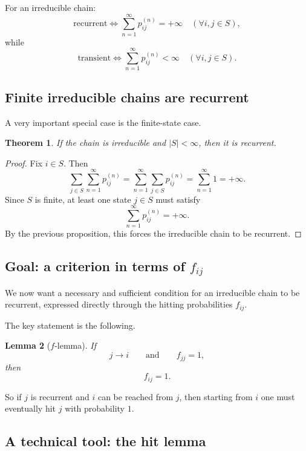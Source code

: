 \documentclass[11pt]{article}
\newtheorem{theorem}{Theorem}[section]
\newtheorem{lemma}[theorem]{Lemma}
\theoremstyle{definition}
\begin{document}
\begin{keyformula}
For an irreducible chain:
\[
\text{recurrent}
\iff
\sum_{n=1}^\infty p_{ij}^{(n)}=+\infty \quad (\forall i,j\in S),
\]
while
\[
\text{transient}
\iff
\sum_{n=1}^\infty p_{ij}^{(n)}<\infty \quad (\forall i,j\in S).
\]
\end{keyformula}

\subsection{Finite irreducible chains are recurrent}

A very important special case is the finite-state case.

\begin{theorem}
If the chain is irreducible and \(|S|<\infty\), then it is recurrent.
\end{theorem}

\begin{proof}
Fix \(i\in S\). Then
\[
\sum_{j\in S}\sum_{n=1}^\infty p_{ij}^{(n)}
=
\sum_{n=1}^\infty \sum_{j\in S} p_{ij}^{(n)}
=
\sum_{n=1}^\infty 1
=
+\infty.
\]
Since \(S\) is finite, at least one state \(j\in S\) must satisfy
\[
\sum_{n=1}^\infty p_{ij}^{(n)}=+\infty.
\]
By the previous proposition, this forces the irreducible chain to be recurrent.
\end{proof}

\subsection{Goal: a criterion in terms of \texorpdfstring{$f_{ij}$}{fij}}

We now want a necessary and sufficient condition for an irreducible chain to be recurrent, expressed directly through the hitting probabilities \(f_{ij}\).

The key statement is the following.

\begin{lemma}[\(f\)-lemma]
If
\[
j\to i
\qquad\text{and}\qquad
f_{jj}=1,
\]
then
\[
f_{ij}=1.
\]
\end{lemma}

So if \(j\) is recurrent and \(i\) can be reached from \(j\), then starting from \(i\) one must eventually hit \(j\) with probability \(1\).

\subsection{A technical tool: the hit lemma}
\end{document}
